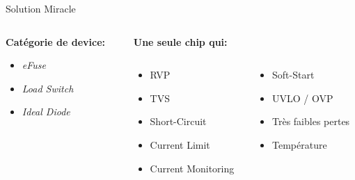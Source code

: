 \begin{frame}{Solution Miracle}
    \begin{columns}
        \begin{column}{0.33\textwidth}
            \textbf<1>{Catégorie de device:}
            \begin{itemize}
                \item<1-> \textit{eFuse}
                \item<1-> \textit{Load Switch}
                \item<1-> \textit{Ideal Diode}
            \end{itemize}
        \end{column}
        \pause
        \begin{column}{0.66\textwidth}
            \begin{center}
                \textbf{Une seule chip qui:}
            \end{center}
            \begin{columns}
                \begin{column}{0.5\textwidth}
                    \begin{itemize}
                        \item \small{RVP}
                        \item \small{TVS}
                        \item \small{Short-Circuit}
                        \item \small{Current Limit}
                        \item \small{Current Monitoring}
                    \end{itemize}
                \end{column}
                \begin{column}{0.5\textwidth}
                    \begin{itemize}
                        \item \small{Soft-Start}
                        \item \small{UVLO / OVP}
                        \item \small{Très faibles pertes}
                        \item \small{Température}
                    \end{itemize}
                \end{column}
            \end{columns}
            

\end{column}
\end{columns}
\end{frame}
